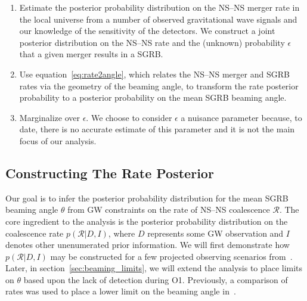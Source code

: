 \documentclass[twocolumn,nofootinbib]{revtex4-1}
\newcommand{\cbcrate}{{{\mathcal R}}}
\newcommand{\BNS}{\ac{NS}--\ac{NS}\xspace}
\begin{document}
\begin{enumerate}
    \item Estimate the posterior probability distribution on the \BNS merger rate
    in the local universe from a number of observed gravitational wave signals
    and our knowledge of the sensitivity of the detectors.  We construct a joint
    posterior distribution on the \BNS rate and the (unknown) probability
    $\epsilon$ that a given merger results in a \ac{SGRB}.
\item Use equation~\ref{eq:rate2angle}, which relates the \BNS merger and
    \ac{SGRB} rates via the geometry of the beaming angle, to transform the rate
    posterior probability to a posterior probability on the mean \ac{SGRB}
    beaming angle.
\item Marginalize over $\epsilon$. We choose to consider $\epsilon$ a nuisance
    parameter because, to date, there is no accurate estimate of this parameter
    and it is not the main focus of our analysis. 
\end{enumerate}


\subsection{Constructing The Rate Posterior}
\label{sec:rate_posterior}


Our goal is to infer the posterior probability distribution for the mean
\ac{SGRB} beaming angle $\theta$ from \ac{GW} constraints on the rate of \BNS
coalescence $\cbcrate$.  The core ingredient to the analysis is the posterior
probability distribution on the coalescence rate $p(\cbcrate|D,I)$, where $D$
represents some \ac{GW} observation and $I$ denotes other unenumerated prior
information.  We will first demonstrate how $p(\cbcrate|D,I)$ may be constructed
for a few projected observing scenarios from~\cite{Aasi:2013wya}.  Later, in
section~\ref{sec:beaming_limits}, we will extend the analysis to place
limits on $\theta$ based upon the lack of detection during O1. Previously, a
comparison of rates was used to place a lower limit on the beaming angle
in~\cite{Abbott:2016ymx}.
\end{document}
